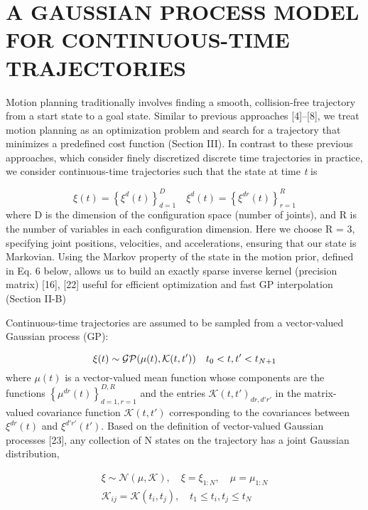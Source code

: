 \documentclass{IEEEtran}
\begin{document}
\section{A GAUSSIAN PROCESS MODEL FOR CONTINUOUS-TIME TRAJECTORIES}
Motion planning traditionally involves finding a smooth,
collision-free trajectory from a start state to a goal state.
Similar to previous approaches [4]–[8], we treat motion planning as an optimization problem and search for a trajectory
that minimizes a predefined cost function (Section III). In
contrast to these previous approaches, which consider finely
discretized discrete time trajectories in practice, we consider
continuous-time trajectories such that the state at time \emph{t} is 

\begin{equation}
\xi(t)=\left\{\xi^d(t)\right\}^D_{d=1} \quad
\xi^d(t)=\left\{\xi^{dr}(t)\right\}^R_{r=1}
\end{equation}
where D is the dimension of the configuration space (number
of joints), and R is the number of variables in each configuration dimension. Here we choose R = 3, specifying joint
positions, velocities, and accelerations, ensuring that our
state is Markovian. Using the Markov property of the state in
the motion prior, defined in Eq. 6 below, allows us to build
an exactly sparse inverse kernel (precision matrix) [16], [22]
useful for efficient optimization and fast GP interpolation
(Section II-B)

Continuous-time trajectories are assumed to be sampled
from a vector-valued Gaussian process (GP):

\begin{equation}
\xi(t)\sim{\emph{$\mathcal{GP}$}}(\mu(t),{\mathcal{K}}(t,t')) \quad 
t_0<t,t'<t_{N+1}
\end{equation}
where $\mu(t)$ is a vector-valued mean function whose components are the functions $\left\{\mu^{dr}{(t)}\right\}^{D,R}_{d=1,r=1}$ and the entries ${\mathcal{K}}(t,t')_{{dr},{d'r'}}$ in the matrix-valued covariance function  ${\mathcal{K}}(t,t')$ corresponding to the covariances between $\xi^{dr}(t)$ and $\xi^{d'r'}(t')$. Based on the definition of vector-valued Gaussian
processes [23], any collection of N states on the trajectory
has a joint Gaussian distribution,

\begin{equation}
\begin{split}
\xi\sim{\mathcal{N}(\mu,\mathcal{K})},\quad \xi=\xi_{1:N}, \quad \mu=\mu_{1:N} \\
\mathcal{K}_{ij}=\mathcal{K}(t_i,t_j),\quad 
t_1\leq{t_i},t_j\leq{t_N}
\end{split}
\end{equation}
\end{document}

